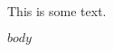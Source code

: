 \documentclass{cobaltCV}
\begin{document}
\begin{paracol}{2}

\begin{minipage}{\leftcolumnwidth}
      \color{white}

        This is some text.
      \end{minipage}

\switchcolumn

$body$
\end{paracol}
\end{document}
